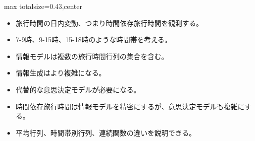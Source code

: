 \clearpage
{}
\begin{minipage}[t]{0.405\textwidth}
\begin{adjustbox}{max totalsize={\textwidth}{0.43\textheight},center}
\begin{minipage}{\textwidth}\scriptsize
{}\begin{itemize}
\item 旅行時間の日内変動、つまり時間依存旅行時間を観測する。
\item 7-9時、9-15時、15-18時のような時間帯を考える。
\item 情報モデルは複数の旅行時間行列の集合を含む。
\item 情報生成はより複雑になる。
\item 代替的な意思決定モデルが必要になる。
\end{itemize}\begin{itemize}
\item 時間依存旅行時間は情報モデルを精密にするが、意思決定モデルも複雑にする。
\item 平均行列、時間帯別行列、連続関数の違いを説明できる。
\end{itemize}
\end{minipage}
\end{adjustbox}
\end{minipage}\hfill
